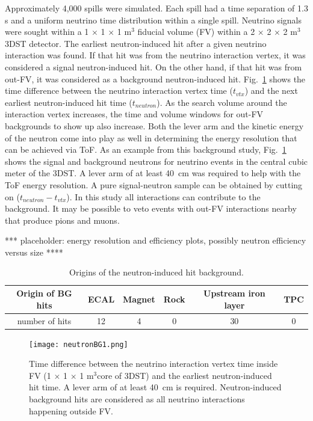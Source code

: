 Approximately 4,000 spills were simulated. Each spill had a time separation of 1.3 s and a uniform neutrino time distribution within a single spill. 
Neutrino signals were sought within a 1 $\times$ 1 $\times$ 1 m$^{3}$ fiducial volume (FV) within a 2 $\times$ 2 $\times$ 2 m$^{3}$ 3DST detector. The earliest neutron-induced hit after a given neutrino interaction was found. If that hit was from the neutrino interaction vertex, it was considered a signal neutron-induced hit. On the other hand, if that hit was from out-FV, it was considered as a background neutron-induced hit.
Fig.~\ref{fig:neutronBG1} shows the time difference between the neutrino interaction vertex time ($t_{vtx}$) and the next earliest neutron-induced hit time ($t_{neutron}$). As the search volume around the interaction vertex increases, the time and volume windows for out-FV backgrounds to show up also increase. Both the lever arm and the kinetic energy of the neutron come into play as well in determining the energy resolution that can be achieved via ToF. As an example from this background study, Fig.~\ref{fig:neutronBG1} shows the signal and background neutrons for neutrino events in the central cubic meter of the 3DST.  A lever arm of at least 40~cm was required to help with the ToF energy resolution.  A pure signal-neutron sample can be obtained by cutting on ($t_{neutron} - t_{vtx}$). In this study all interactions can contribute to the background.  It may be possible to veto events with out-FV interactions nearby that produce pions and muons.

*** placeholder: energy resolution and efficiency plots, possibly neutron efficiency versus size ****

\begin{table}[]
\begin{center}
\begin{tabular}{c|c|c|c|c|c}
Origin of BG hits &  ECAL & Magnet  & Rock & Upstream iron layer & TPC  \\\hline
number of hits & 12 & 4 & 0 & 30 & 0
\end{tabular}
\end{center}
\caption{\label{tab:neutronBG1} Origins of the neutron-induced hit background. }
\end{table}

\begin{figure}
\begin{center}
  \texttt{[image: neutronBG1.png]}
\caption{\label{fig:neutronBG1} Time difference between the neutrino interaction vertex time inside FV (1 $\times$ 1 $\times$ 1 m$^{3}$core of 3DST) and the earliest neutron-induced hit time. A lever arm of at least 40~cm is required. Neutron-induced background hits are considered as all neutrino interactions happening outside FV.} 
\end{center}
\end{figure}

